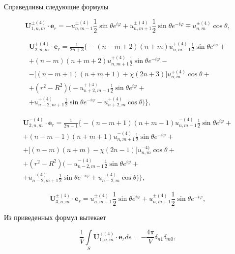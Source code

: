 Справедливы следующие формулы

\begin{equation}
\mathbf{U}_{1,n,m}^{\pm(4)}\cdot\mathbf{e}_r=-u_{n,m-1}^{\pm(4)}\frac{1}{2}\sin\theta e^{i\varphi}+u_{n,m+1}^{\pm(4)}\frac{1}{2}\sin\theta e^{-i\varphi}\mp u_{n,m}^{\pm(4)}\cos\theta,
\label{eq:12:11}
\end{equation}

\begin{multline}
\mathbf{U}_{2,n,m}^{+(4)}\cdot\mathbf{e}_r=\frac{1}{2n+3}\bigg\{-(n-m+2)(n+m)u_{n,m-1}^{+(4)}\frac{1}{2}\sin\theta e^{i\varphi}+ \\
+(n-m)(n+m+2)u_{n,m+1}^{+(4)}\frac{1}{2}\sin\theta e^{-i\varphi}- \\
-\bigg\lbrack(n-m+1)(n+m+1)+\chi(2n+3)\bigg\rbrack u_{n,m}^{+(4)}\cos\theta+ \\
+(r^2-R^2)\bigg(-u_{n+2,m-1}^{+(4)}\frac{1}{2}\sin\theta e^{i\varphi}+ \\
+u_{n+2,m+1}^{+(4)}\frac{1}{2}\sin\theta e^{-i\varphi}-u_{n+2,m}^{+(4)}\cos\theta\bigg)\bigg\},
\label{eq:12:12}
\end{multline}

\begin{multline}
\mathbf{U}_{2,n,m}^{-(4)}\cdot\mathbf{e}_r=\frac{1}{2n-1}\bigg\{-(n-m+1)(n+m-1)u_{n,m-1}^{-(4)}\frac{1}{2}\sin\theta e^{i\varphi}+ \\
+(n-m-1)(n+m+1)u_{n,m+1}^{-(4)}\frac{1}{2}\sin\theta e^{-i\varphi}+ \\
+\bigg\lbrack(n-m)(n+m)-\chi(2n-1)\bigg\rbrack u_{n,m}^{-4)}\cos\theta+ \\
+(r^2-R^2)\bigg(-u_{n-2,m-1}^{-(4)}\frac{1}{2}\sin\theta e^{i\varphi}+ \\
+u_{n-2,m+1}^{-(4)}\frac{1}{2}\sin\theta e^{-i\varphi}+u_{n-2,m}^{-(4)}\cos\theta\bigg)\bigg\},
\label{eq:12:13}
\end{multline}

\begin{equation}
\mathbf{U}_{3,n,m}^{\pm(4)}\cdot\mathbf{e}_r=u_{n,m-1}^{\pm(4)}\frac{1}{2}\sin\theta e^{i\varphi}+u_{n,m+1}^{\pm(4)}\frac{1}{2}\sin\theta e^{-i\varphi},
\label{eq:12:14}
\end{equation}

Из приведенных формул вытекает

\begin{equation}
\frac{1}{V}\int\limits_S \mathbf{U}_{1,n,m}^{+(4)}\cdot\mathbf{e}_r ds=-\frac{4\pi}{V}\delta_{n1}\delta_{m0},
\label{eq:12:15}
\end{equation}

